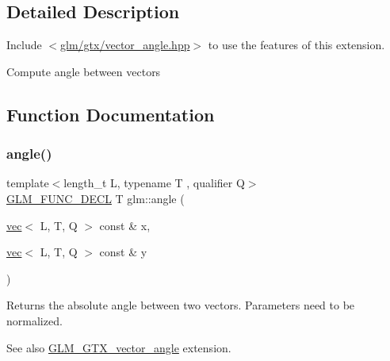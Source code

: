 \subsection{Detailed Description}
Include $<$\hyperlink{vector__angle_8hpp}{glm/gtx/vector\+\_\+angle.\+hpp}$>$ to use the features of this extension.

Compute angle between vectors 

\subsection{Function Documentation}
\mbox{\label{group__gtx__vector__angle_ga2e2917b4cb75ca3d043ac15ff88f14e1}} 
\subsubsection{\texorpdfstring{angle()}{angle()}}
{\footnotesize\ttfamily template$<$length\+\_\+t L, typename T , qualifier Q$>$ \\
\hyperlink{setup_8hpp_ab2d052de21a70539923e9bcbf6e83a51}{G\+L\+M\+\_\+\+F\+U\+N\+C\+\_\+\+D\+E\+CL} T glm\+::angle (\begin{DoxyParamCaption}\item[{\hyperlink{structglm_1_1vec}{vec}$<$ L, T, Q $>$ const \&}]{x,  }\item[{\hyperlink{structglm_1_1vec}{vec}$<$ L, T, Q $>$ const \&}]{y }\end{DoxyParamCaption})}

Returns the absolute angle between two vectors. Parameters need to be normalized. \begin{DoxySeeAlso}{See also}
\hyperlink{group__gtx__vector__angle}{G\+L\+M\+\_\+\+G\+T\+X\+\_\+vector\+\_\+angle} extension. 
\end{DoxySeeAlso}
\mbox{\label{group__gtx__vector__angle_ga9556a803dce87fe0f42fdabe4ebba1d5}} 
